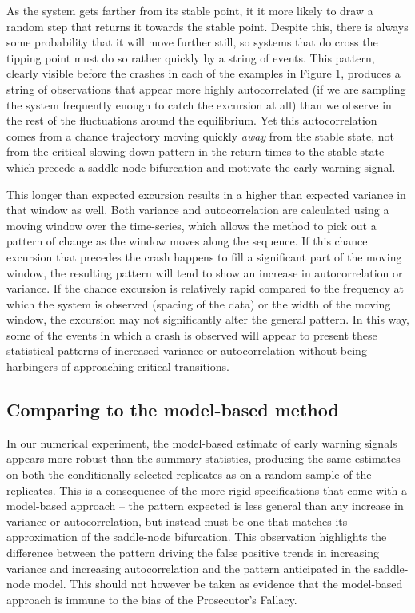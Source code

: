 \documentclass[authoryear,review,12pt]{elsarticle}
\begin{document}
As the system gets farther from its stable point, it it more likely to draw a random step that
returns it towards the stable point. Despite this, there is always some probability that
it will move further still, so systems that do cross the tipping point must do
so rather quickly by a string of events.  This pattern, clearly visible before the crashes in each of
the examples in Figure 1, produces a string of observations that appear
more highly autocorrelated (if we are sampling the system frequently
enough to catch the excursion at all) than we observe in the rest of the
fluctuations around the equilibrium.  Yet this autocorrelation comes from
a chance trajectory moving quickly \emph{away} from the stable state,
not from the critical slowing down pattern in the return times to the
stable state which precede a saddle-node bifurcation and motivate the
early warning signal.


This longer than expected excursion results in a higher than expected
variance in that window as well. Both variance and autocorrelation are
calculated using a moving window over the time-series, which allows
the method to pick out a pattern of change as the window moves along
the sequence. If this chance excursion that precedes the crash happens
to fill a significant part of the moving window, the resulting pattern
will tend to show an increase in autocorrelation or variance.  If the
chance excursion is relatively rapid compared to the frequency at which
the system is observed (spacing of the data) or the width of the moving
window, the excursion may not significantly alter the general pattern.
In this way, some of the events in which a crash is observed will
appear to present these statistical patterns of increased variance
or autocorrelation without being harbingers of approaching critical
transitions.


\subsection{Comparing to the model-based method}

In our numerical experiment, the model-based estimate of early warning signals
appears more robust than the summary statistics, producing the same
estimates on both the conditionally selected replicates as on a random
sample of the replicates.  This is a consequence of the more rigid
specifications that come with a model-based approach -- the pattern
expected is less general than any increase in variance or autocorrelation,
but instead must be one that matches its approximation of the saddle-node
bifurcation. This observation highlights the difference between the
pattern driving the false positive trends in increasing variance and
increasing autocorrelation and the pattern anticipated in the saddle-node
model. This should not however be taken as evidence that the model-based
approach is immune to the bias of the Prosecutor's Fallacy.
\end{document}
